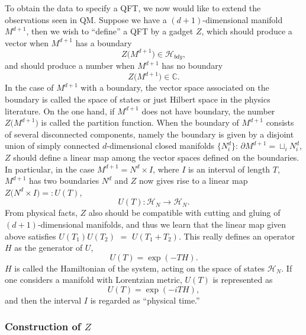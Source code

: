 To obtain the data to specify a QFT, we now would like to extend the
observations seen in QM. Suppose we have a $(d+1)$-dimensional manifold
$M^{d+1}$, then we wish to ``define'' a QFT by a gadget $Z$, which
should produce a vector when $M^{d+1}$ has a boundary
\begin{equation}
Z\big(M^{d+1}\big)  \in  \mathcal{H}_{bdy},
\end{equation}
and should produce a number when $M^{d+1}$ has no boundary
\begin{equation}
Z\big(M^{d+1}\big)  \in  \mathbb{C}.
\end{equation}
In the case of $M^{d+1}$ with a boundary, the vector space associated
on the boundary is called the space of states or just Hilbert space
in the physics literature. On the one hand, if $M^{d+1}$ does not
have boundary, the number $Z\big(M^{d+1}\big)$ is called the partition
function. When the boundary of $M^{d+1}$ consists of several disconnected components,
namely the boundary is given by a disjoint union of simply connected
$d$-dimensional closed manifolds $\big\{ N_{i}^{d}\big\}$: $\partial M^{d+1}=\sqcup_{i}N_{i}^{d}$,
$Z$ should define a linear map among the vector spaces defined on
the boundaries. In particular, in the case $M^{d+1}=N^{d}\times I$,
where $I$ is an interval of length $T$, $M^{d+1}$ has two boundaries
$N^{d}$ and $Z$ now gives rise to a linear map $Z\big(N^{d}\times I\big)=:U(T)$,
\begin{equation}
  U(T) : \mathcal{H}_{N} \longrightarrow \mathcal{H}_{N}.
\end{equation}
From  physical facts, $Z$ also should be compatible with cutting and
gluing of $(d+1)$-dimensional manifolds, and thus we learn that the
linear map given above satisfies $U(T_{1})U(T_{2})$ $=$ $U(T_{1}+T_{2})$.
This really defines an operator $H$ as the generator of $U$,
\begin{equation}
  U(T)  =  \exp (-TH).
\end{equation}
$H$ is called the Hamiltonian of the system, acting on the space
of states $\mathcal{H}_{N}$. If one considers a manifold
with Lorentzian metric, $U(T)$ is represented as
\begin{equation}
  U(T)  =  \exp (-iTH),
\end{equation}
and then the interval $I$ is regarded as ``physical time.''





\subsubsection{Construction of $Z$}

